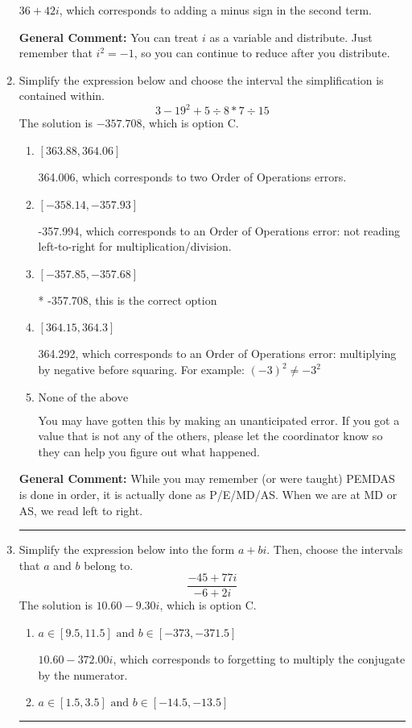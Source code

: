 \documentclass{extbook}[14pt]
\newcommand{\litem}[1]{\item #1

\rule{\textwidth}{0.4pt}}
\begin{document}
\begin{enumerate}
{\begin{enumerate}[label=\Alph*.]
 $36 + 42 i$, which corresponds to adding a minus sign in the second term.
\end{enumerate}

\textbf{General Comment:} You can treat $i$ as a variable and distribute. Just remember that $i^2=-1$, so you can continue to reduce after you distribute.
}
\litem{
Simplify the expression below and choose the interval the simplification is contained within.
\[ 3 - 19^2 + 5 \div 8 * 7 \div 15 \]The solution is \( -357.708 \), which is option C.\begin{enumerate}[label=\Alph*.]
\item \( [363.88, 364.06] \)

 364.006, which corresponds to two Order of Operations errors.
\item \( [-358.14, -357.93] \)

 -357.994, which corresponds to an Order of Operations error: not reading left-to-right for multiplication/division.
\item \( [-357.85, -357.68] \)

* -357.708, this is the correct option
\item \( [364.15, 364.3] \)

 364.292, which corresponds to an Order of Operations error: multiplying by negative before squaring. For example: $(-3)^2 \neq -3^2$
\item \( \text{None of the above} \)

 You may have gotten this by making an unanticipated error. If you got a value that is not any of the others, please let the coordinator know so they can help you figure out what happened.
\end{enumerate}

\textbf{General Comment:} While you may remember (or were taught) PEMDAS is done in order, it is actually done as P/E/MD/AS. When we are at MD or AS, we read left to right.
}
\litem{
Simplify the expression below into the form $a+bi$. Then, choose the intervals that $a$ and $b$ belong to.
\[ \frac{-45 + 77 i}{-6 + 2 i} \]The solution is \( 10.60  - 9.30 i \), which is option C.\begin{enumerate}[label=\Alph*.]
\item \( a \in [9.5, 11.5] \text{ and } b \in [-373, -371.5] \)

 $10.60  - 372.00 i$, which corresponds to forgetting to multiply the conjugate by the numerator.
\item \( a \in [1.5, 3.5] \text{ and } b \in [-14.5, -13.5] \)


\end{enumerate}}
\end{enumerate}
\end{document}
